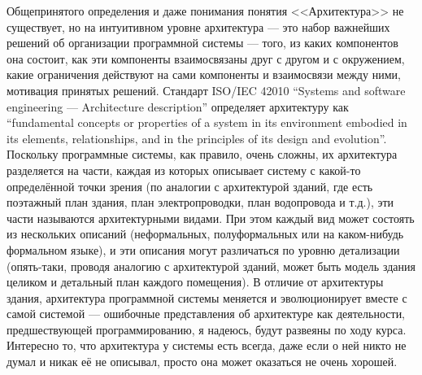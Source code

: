 \documentclass[a5paper]{article}
\begin{document}
Общепринятого определения и даже понимания понятия <<Архитектура>> не существует, но на интуитивном уровне архитектура --- это набор важнейших решений об организации программной системы --- того, из каких компонентов она состоит, как эти компоненты взаимосвязаны друг с другом и с окружением, какие ограничения действуют на сами компоненты и взаимосвязи между ними, мотивация принятых решений. Стандарт ISO/IEC 42010 ``Systems and software engineering --- Architecture description'' определяет архитектуру как ``fundamental concepts or properties of a system in its environment embodied in its elements, relationships, and in the principles of its design and evolution''. Поскольку программные системы, как правило, очень сложны, их архитектура разделяется на части, каждая из которых описывает систему с какой-то определённой точки зрения (по аналогии с архитектурой зданий, где есть поэтажный план здания, план электропроводки, план водопровода и т.д.), эти части называются архитектурными видами. При этом каждый вид может состоять из нескольких описаний (неформальных, полуформальных или на каком-нибудь формальном языке), и эти описания могут различаться по уровню детализации (опять-таки, проводя аналогию с архитектурой зданий, может быть модель здания целиком и детальный план каждого помещения). В отличие от архитектуры здания, архитектура программной системы меняется и эволюционирует вместе с самой системой --- ошибочные представления об архитектуре как деятельности, предшествующей программированию, я надеюсь, будут развеяны по ходу курса. Интересно то, что архитектура у системы есть всегда, даже если о ней никто не думал и никак её не описывал, просто она может оказаться не очень хорошей.
\end{document}
